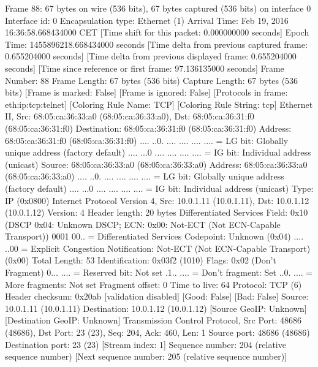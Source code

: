 Frame 88: 67 bytes on wire (536 bits), 67 bytes captured (536 bits) on interface 0
    Interface id: 0
    Encapsulation type: Ethernet (1)
    Arrival Time: Feb 19, 2016 16:36:58.668434000 CET
    [Time shift for this packet: 0.000000000 seconds]
    Epoch Time: 1455896218.668434000 seconds
    [Time delta from previous captured frame: 0.655204000 seconds]
    [Time delta from previous displayed frame: 0.655204000 seconds]
    [Time since reference or first frame: 97.136135000 seconds]
    Frame Number: 88
    Frame Length: 67 bytes (536 bits)
    Capture Length: 67 bytes (536 bits)
    [Frame is marked: False]
    [Frame is ignored: False]
    [Protocols in frame: eth:ip:tcp:telnet]
    [Coloring Rule Name: TCP]
    [Coloring Rule String: tcp]
Ethernet II, Src: 68:05:ca:36:33:a0 (68:05:ca:36:33:a0), Dst: 68:05:ca:36:31:f0 (68:05:ca:36:31:f0)
    Destination: 68:05:ca:36:31:f0 (68:05:ca:36:31:f0)
        Address: 68:05:ca:36:31:f0 (68:05:ca:36:31:f0)
        .... ..0. .... .... .... .... = LG bit: Globally unique address (factory default)
        .... ...0 .... .... .... .... = IG bit: Individual address (unicast)
    Source: 68:05:ca:36:33:a0 (68:05:ca:36:33:a0)
        Address: 68:05:ca:36:33:a0 (68:05:ca:36:33:a0)
        .... ..0. .... .... .... .... = LG bit: Globally unique address (factory default)
        .... ...0 .... .... .... .... = IG bit: Individual address (unicast)
    Type: IP (0x0800)
Internet Protocol Version 4, Src: 10.0.1.11 (10.0.1.11), Dst: 10.0.1.12 (10.0.1.12)
    Version: 4
    Header length: 20 bytes
    Differentiated Services Field: 0x10 (DSCP 0x04: Unknown DSCP; ECN: 0x00: Not-ECT (Not ECN-Capable Transport))
        0001 00.. = Differentiated Services Codepoint: Unknown (0x04)
        .... ..00 = Explicit Congestion Notification: Not-ECT (Not ECN-Capable Transport) (0x00)
    Total Length: 53
    Identification: 0x03f2 (1010)
    Flags: 0x02 (Don't Fragment)
        0... .... = Reserved bit: Not set
        .1.. .... = Don't fragment: Set
        ..0. .... = More fragments: Not set
    Fragment offset: 0
    Time to live: 64
    Protocol: TCP (6)
    Header checksum: 0x20ab [validation disabled]
        [Good: False]
        [Bad: False]
    Source: 10.0.1.11 (10.0.1.11)
    Destination: 10.0.1.12 (10.0.1.12)
    [Source GeoIP: Unknown]
    [Destination GeoIP: Unknown]
Transmission Control Protocol, Src Port: 48686 (48686), Dst Port: 23 (23), Seq: 204, Ack: 460, Len: 1
    Source port: 48686 (48686)
    Destination port: 23 (23)
    [Stream index: 1]
    Sequence number: 204    (relative sequence number)
    [Next sequence number: 205    (relative sequence number)]
